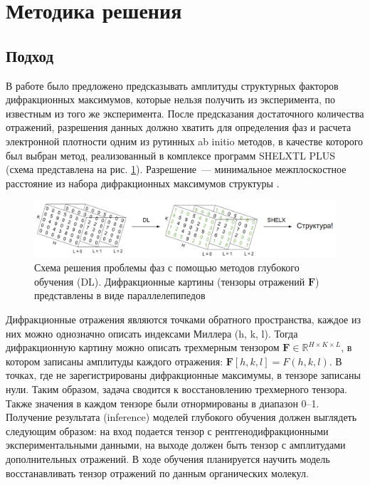\section{Методика решения}

\subsection{Подход}

В работе было предложено предсказывать амплитуды структурных факторов дифракционных максимумов, которые нельзя получить из эксперимента, по известным из того же эксперимента. После предсказания достаточного количества отражений, разрешения данных должно хватить для определения фаз и расчета электронной плотности одним из рутинных ab initio методов, в качестве которого был выбран метод, реализованный в комплексе программ SHELXTL PLUS \cite{sheldrick_shelxt_2015} (схема представлена на рис. \ref{schema}). Разрешение~--- минимальное межплоскостное расстояние из набора дифракционных максимумов структуры \cite{girolami_x-ray_2016}.

\begin{figure}[H]
	\centering
	\includegraphics[width=1\textwidth]{figures/schema.png}\hfill
	\caption{Схема решения проблемы фаз с помощью методов глубокого обучения (DL). Дифракционные картины (тензоры отражений $\textbf{F}$) представлены в виде параллелепипедов}
	\label{schema}
\end{figure}

Дифракционные отражения являются точками обратного пространства, каждое из них можно однозначно описать индексами Миллера (h, k, l). Тогда дифракционную картину можно описать трехмерным тензором $\textbf{F}\in \mathbb{R}^{H\times K\times L}$, в котором записаны амплитуды каждого отражения: $\textbf{F}[h, k, l] = F (h,k,l)$. В точках, где не зарегистрированы дифракционные максимумы, в тензоре записаны нули. Таким образом, задача сводится к восстановлению трехмерного тензора. Также значения в каждом тензоре были отнормированы в диапазон 0--1. Получение результата (inference) моделей глубокого обучения должен выглядеть следующим образом: на вход подается тензор с рентгенодифракционными экспериментальными данными, на выходе должен быть тензор с амплитудами дополнительных отражений. В ходе обучения планируется научить модель восстанавливать тензор отражений по данным органических молекул. 

